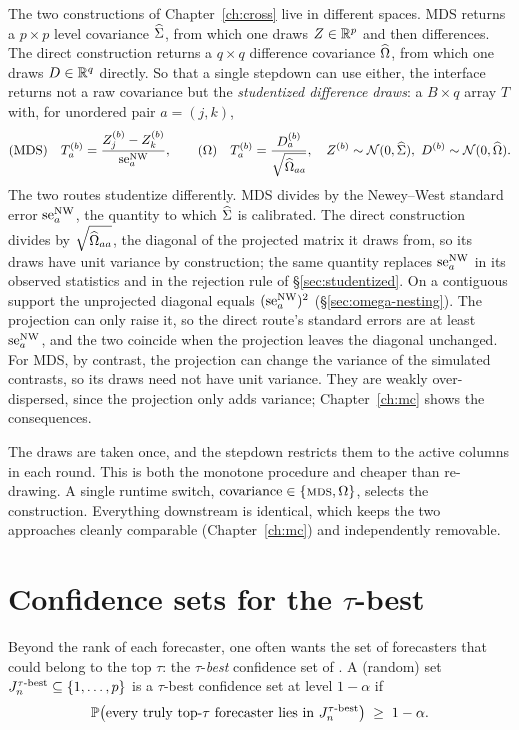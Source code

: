 The two constructions of Chapter~\ref{ch:cross} live in different spaces. MDS returns a
$p\times p$ level covariance $\widehat{\Sigma}$, from which one draws $Z\in\mathbb{R}^p$ and then
differences. The direct construction returns a $q\times q$ difference covariance
$\widehat{\Omega}$, from which one draws $D\in\mathbb{R}^q$ directly. So that a single stepdown can
use either, the interface returns not a raw covariance but the \emph{studentized
difference draws}: a $B\times q$ array $T$ with, for unordered pair $a=(j,k)$,
\begin{equation}
  \text{(MDS)}\quad T^{(b)}_a=\frac{Z^{(b)}_j-Z^{(b)}_k}{\seNW{a}},
  \qquad
  \text{($\OmegaDirect$)}\quad T^{(b)}_a=\frac{D^{(b)}_a}{\sqrt{\Omegahat_{aa}}},
  \quad Z^{(b)}\sim\Normal(0,\Sh),\ D^{(b)}\sim\Normal(0,\Omegahat).
\end{equation}
The two routes studentize differently. MDS divides by the Newey--West standard error
$\mathrm{se}^{\mathrm{NW}}_{a}$, the quantity to which $\widehat{\Sigma}$ is calibrated. The direct construction divides
by $\sqrt{\widehat{\Omega}_{aa}}$, the diagonal of the projected matrix it draws from, so its
draws have unit variance by construction; the same quantity replaces $\mathrm{se}^{\mathrm{NW}}_{a}$ in its
observed statistics and in the rejection rule of \S\ref{sec:studentized}. On a
contiguous support the unprojected diagonal equals $(\mathrm{se}^{\mathrm{NW}}_{a})^2$
(\S\ref{sec:omega-nesting}). The projection can only raise it, so the direct route's
standard errors are at least $\mathrm{se}^{\mathrm{NW}}_{a}$, and the two coincide when the projection leaves
the diagonal unchanged. For MDS, by contrast, the projection can change the variance of
the simulated contrasts, so its draws need not have unit variance. They are weakly
over-dispersed, since the projection only adds variance; Chapter~\ref{ch:mc} shows the
consequences.

The draws are taken once, and the stepdown restricts them to the active columns in each
round. This is both the monotone procedure and cheaper than re-drawing. A single runtime
switch, $\text{covariance}\in\{\textsc{mds},\Omega\}$, selects the construction.
Everything downstream is identical, which keeps the two approaches cleanly comparable
(Chapter~\ref{ch:mc}) and independently removable.

\section{Confidence sets for the $\tau$-best}
\label{sec:taubest}

Beyond the rank of each forecaster, one often wants the set of forecasters that could
belong to the top $\tau$: the $\tau$-\emph{best} confidence set of
\citet[Section~3.4]{mogstad2024}. A (random) set $J^{\tau\text{-best}}_n\subseteq\{1,\dots,p\}$ is a
$\tau$-best confidence set at level $1-\alpha$ if
\begin{equation}
  \mathbb{P}\big(\text{every truly top-$\tau$ forecaster lies in } J^{\tau\text{-best}}_n\big)\;\ge\;1-\alpha.
  \label{eq:tau-coverage}
\end{equation}

